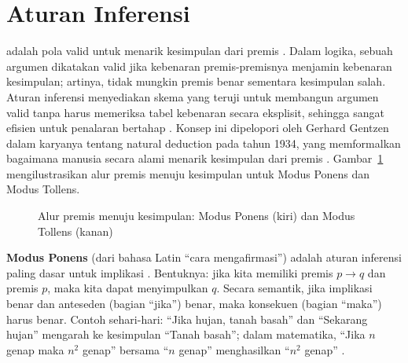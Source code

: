 \section{Aturan Inferensi}

 adalah pola valid untuk menarik kesimpulan dari premis \cite{rosen2019,gentzen1934}. Dalam logika, sebuah argumen dikatakan valid jika kebenaran premis-premisnya menjamin kebenaran kesimpulan; artinya, tidak mungkin premis benar sementara kesimpulan salah. Aturan inferensi menyediakan skema yang teruji untuk membangun argumen valid tanpa harus memeriksa tabel kebenaran secara eksplisit, sehingga sangat efisien untuk penalaran bertahap \cite{forallx,iep_natded}. Konsep ini dipelopori oleh Gerhard Gentzen dalam karyanya tentang natural deduction pada tahun 1934, yang memformalkan bagaimana manusia secara alami menarik kesimpulan dari premis \cite{gentzen1934,wiki_natded}. Gambar~\ref{fig:inference-flow-bab6} mengilustrasikan alur premis menuju kesimpulan untuk Modus Ponens dan Modus Tollens.

\begin{figure}[htbp]
\centering
{}
\caption{Alur premis menuju kesimpulan: Modus Ponens (kiri) dan Modus Tollens (kanan)}
\label{fig:inference-flow-bab6}
\end{figure}

\textbf{Modus Ponens} (dari bahasa Latin ``cara mengafirmasi'') adalah aturan inferensi paling dasar untuk implikasi \cite{rosen2019,forallx}. Bentuknya: jika kita memiliki premis $p \rightarrow q$ dan premis $p$, maka kita dapat menyimpulkan $q$. Secara semantik, jika implikasi benar dan anteseden (bagian ``jika'') benar, maka konsekuen (bagian ``maka'') harus benar. Contoh sehari-hari: ``Jika hujan, tanah basah'' dan ``Sekarang hujan'' mengarah ke kesimpulan ``Tanah basah''; dalam matematika, ``Jika $n$ genap maka $n^2$ genap'' bersama ``$n$ genap'' menghasilkan ``$n^2$ genap'' \cite{iep_natded,copi2014}.

